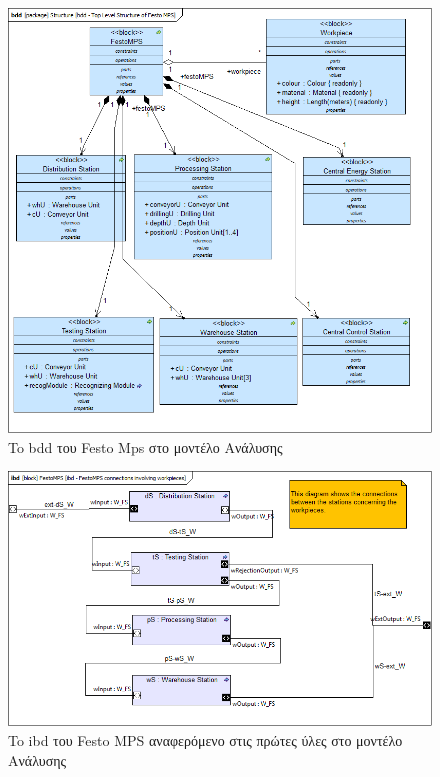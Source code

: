 \documentclass[a4paper,12pt,twoside]{report}
\begin{document}
\begin{appendices}
			\begin{figure}[hp]
					\centering
					\includegraphics[scale=0.30]{AnalysisModel_bdd-TopLevelStructureofFestoMPS.png}
					\caption{To bdd του Festo Mps στο μοντέλο Ανάλυσης}
					\label{φωτ:To bdd του Festo Mps στο μοντέλο Ανάλυσης}
			\end{figure}
			
			\begin{figure}[hp]
					\centering
					\includegraphics[scale=0.30]{AnalysisModel_ibd-FestoMPSconnectionsinvolvingworkpieces.png}
					\caption{To ibd του Festo MPS αναφερόμενο στις πρώτες ύλες στο μοντέλο Ανάλυσης}
					\label{φωτ:To ibd του Festo MPS αναφερόμενο στις πρώτες ύλες στο μοντέλο Ανάλυσης}
			\end{figure}
			

\end{appendices}
\end{document}
